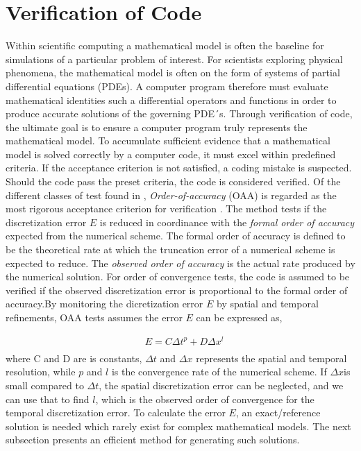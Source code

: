 \section{Verification of Code}
Within scientific computing a mathematical model is often the baseline for simulations of a particular problem of interest. For scientists exploring physical phenomena, the mathematical model is often on the form of systems of partial differential equations (PDEs). A computer program therefore must evaluate  mathematical identities such a differential operators and functions in order to produce accurate solutions of the governing PDE´s. 
Through verification of code, the ultimate goal is to ensure a computer program truly represents the mathematical model. To accumulate sufficient evidence that a mathematical model is solved correctly by a computer code,  it must excel within predefined criteria. If the acceptance criterion is not satisfied, a coding mistake is suspected. Should the code pass the preset criteria, the code is considered verified. Of the different classes of test found in \cite{Roache},  \textit{Order-of-accuracy} (OAA)  is regarded as the most rigorous acceptance criterion for verification \cite{Biggs, Roache, Etienne2006}. The method tests if the discretization error $E$ is reduced in coordinance with the \textit{formal order of accuracy} expected from the numerical scheme. The formal order of accuracy is defined to be the theoretical rate at which the truncation error of a numerical scheme is expected to reduce. The \textit{observed order of accuracy} is the actual rate produced by the numerical solution. For order of convergence tests, the code is assumed to be verified if the observed discretization error is proportional to the formal order of accuracy.By monitoring the dicretization error $E$ by spatial and temporal refinements, OAA tests assumes the error $E$ can be expressed as,

\begin{align*}
&E = C\Delta t^p + D\Delta x^l\\
\end{align*} 
where C and D are is  constants, $\Delta t$ and $\Delta x$ represents the spatial and temporal resolution, while $p$ and $l$ is the convergence rate of the numerical scheme. If $\Delta x$is small compared to $\Delta t$, the spatial discretization error can be neglected, and we can use that to find $l$, which is the observed order of convergence for the temporal discretization error. To calculate the error $E$, an exact/reference solution is needed which rarely exist for complex mathematical models. The next subsection presents an efficient method for generating such solutions.

